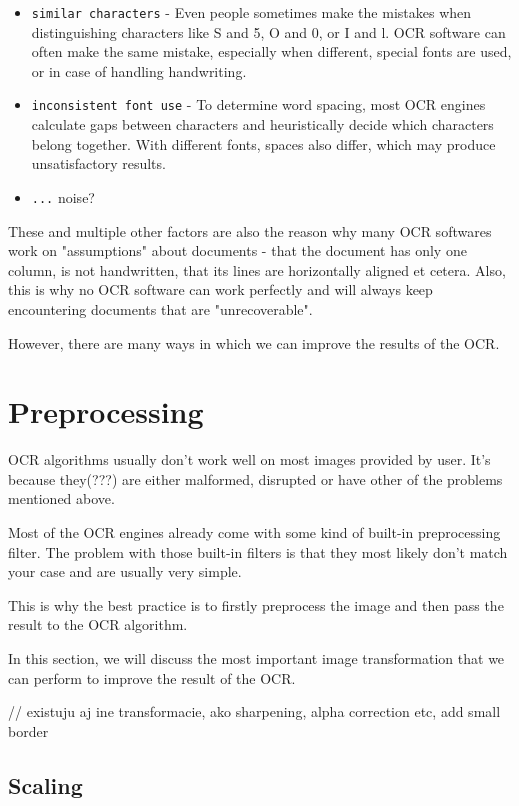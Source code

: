 \begin{itemize}
\item\texttt {similar characters} - Even people sometimes make the mistakes when distinguishing characters like S and 5, O and 0, or I and l. OCR software can often make the same mistake, especially when different, special fonts are used, or in case of handling handwriting.
\item\texttt {inconsistent font use} - To determine word spacing, most OCR engines calculate gaps between characters and heuristically decide which characters belong together. With different fonts, spaces also differ, which may produce unsatisfactory results.
\item\texttt {...} noise?
\end{itemize}

These and multiple other factors are also the reason why many OCR softwares work on "assumptions" about documents - that the document has only one column, is not handwritten, that its lines are horizontally aligned et cetera. Also, this is why no OCR software can work perfectly and will always keep encountering documents that are "unrecoverable". 

However, there are many ways in which we can improve the results of the OCR.

\section{Preprocessing}

OCR algorithms usually don't work well on most images provided by user. It's because they(???) are either malformed, disrupted or have other of the problems mentioned above.

Most of the OCR engines already come with some kind of built-in preprocessing filter. The problem with those built-in filters is that they most likely don't match your case and are usually very simple.

This is why the best practice is to firstly preprocess the image and then pass the result to the OCR algorithm.

In this section, we will discuss the most important image transformation that we can perform to improve the result of the OCR. 

// existuju aj ine transformacie, ako sharpening, alpha correction etc, add small border


\subsection{Scaling}

